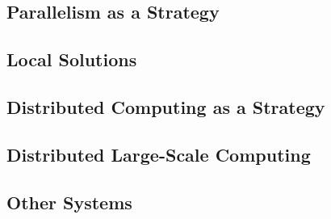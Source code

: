 \subsection{Parallelism as a Strategy}\label{subsec:parallel}

\subsection{Local Solutions}\label{subsec:local}

\subsection{Distributed Computing as a Strategy}\label{subsec:dist}

\subsection{Distributed Large-Scale Computing}\label{subsec:distributed-large-scale-computing}

\subsection{Other Systems}\label{subsec:other-systems}

